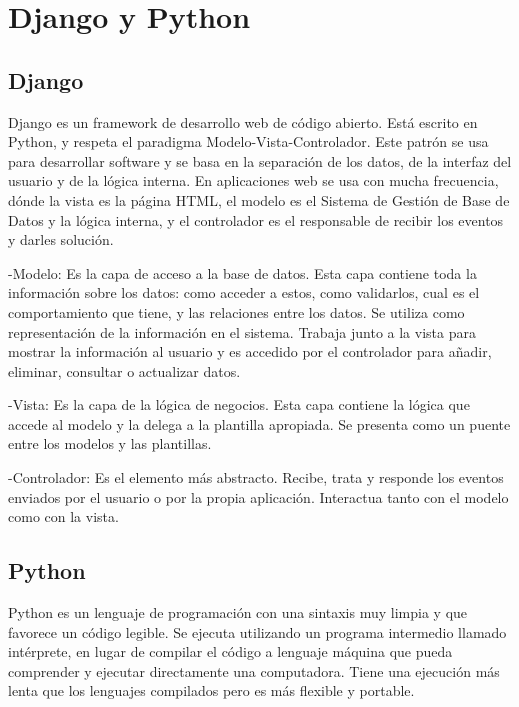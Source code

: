 \documentclass[a4paper, 12pt]{book}
\begin{document}
\section{Django y Python} 
\label{sec:djangopython}

\subsection{Django} 
\label{subsec:django}
Django es un framework de desarrollo web de c\'odigo abierto. Est\'a escrito en Python, y respeta el paradigma Modelo-Vista-Controlador. 
Este patr\'on se usa para desarrollar software y se basa en la separaci\'on de los datos, de la interfaz del usuario y de la l\'ogica interna. 
En aplicaciones web se usa con mucha frecuencia, d\'onde la vista es la p\'agina HTML, el modelo es el Sistema de Gesti\'on de Base de Datos y la 
l\'ogica interna, y el controlador es el responsable de recibir los eventos y darles soluci\'on.

-Modelo: Es la capa de acceso a la base de datos. Esta capa contiene toda la informaci\'on sobre los datos: como acceder a estos, como validarlos, 
cual es el comportamiento que tiene, y las relaciones entre los datos. Se utiliza como representaci\'on de la informaci\'on en el sistema. Trabaja junto 
a la vista para mostrar la informaci\'on al usuario y es accedido por el controlador para a\~nadir, eliminar, consultar o actualizar datos. 
     
-Vista: Es la capa de la l\'ogica de negocios. Esta capa contiene la l\'ogica que accede al modelo y la delega a la plantilla apropiada. Se presenta 
como un puente entre los modelos y las plantillas.

-Controlador: Es el elemento m\'as abstracto. Recibe, trata y responde los eventos enviados por el usuario o por la propia aplicaci\'on. Interactua 
tanto con el modelo como con la vista.



\subsection{Python} 
\label{subsec:python}
Python es un lenguaje de programaci\'on con una sintaxis muy limpia y que favorece un c\'odigo legible. Se ejecuta utilizando un programa intermedio 
llamado int\'erprete, en lugar de compilar el c\'odigo a lenguaje m\'aquina que pueda comprender
y ejecutar directamente una computadora. Tiene una ejecuci\'on m\'as lenta que los lenguajes compilados pero es m\'as flexible y portable.
\end{document}
